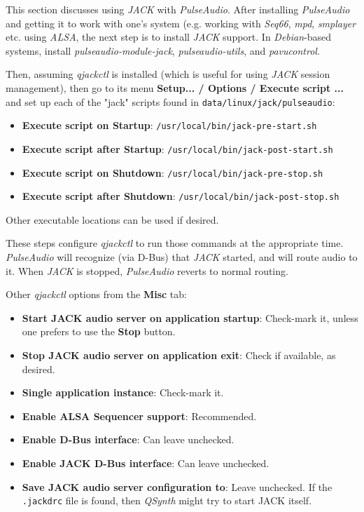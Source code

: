    This section discusses using \textsl{JACK} with \textsl{PulseAudio}.
   After installing \textsl{PulseAudio} and getting it to work with one's
   system (e.g. working with \textsl{Seq66}, \textsl{mpd},
   \textsl{smplayer} etc. using \textsl{ALSA},
   the next step is to install \textsl{JACK} support.
   In \textsl{Debian}-based systems, install \textsl{pulseaudio-module-jack},
   \textsl{pulseaudio-utils}, and \textsl{pavucontrol}.

   Then, assuming \textsl{qjackctl} is installed (which is useful for using
   \textsl{JACK} session management), then go to its menu
   \textbf{Setup... / Options / Execute script ...} and set up each of the
   "jack" scripts found in \texttt{data/linux/jack/pulseaudio}:

   \begin{itemize}
      \item \textbf{Execute script on Startup}:
         \texttt{/usr/local/bin/jack-pre-start.sh}
      \item \textbf{Execute script after Startup}:
         \texttt{/usr/local/bin/jack-post-start.sh}
      \item \textbf{Execute script on Shutdown}:
         \texttt{/usr/local/bin/jack-pre-stop.sh}
      \item \textbf{Execute script after Shutdown}:
         \texttt{/usr/local/bin/jack-post-stop.sh}
   \end{itemize}

   Other executable locations can be used if desired.

   These steps configure \textsl{qjackctl} to run those commands at
   the appropriate time.
   \textsl{PulseAudio} will recognize (via D-Bus) that \textsl{JACK} started,
   and will route audio to it. When \textsl{JACK} is stopped,
   \textsl{PulseAudio} reverts to normal routing.

   Other \textsl{qjackctl} options from the \textbf{Misc} tab:

   \begin{itemize}
      \item \textbf{Start JACK audio server on application startup}:
         Check-mark it, unless one prefers to use the \textbf{Stop} button.
      \item \textbf{Stop JACK audio server on application exit}:
         Check if available, as desired.
      \item \textbf{Single application instance}:
         Check-mark it.
      \item \textbf{Enable ALSA Sequencer support}:
         Recommended.
      \item \textbf{Enable D-Bus interface}:
         Can leave unchecked.
      \item \textbf{Enable JACK D-Bus interface}:
         Can leave unchecked.
      \item \textbf{Save JACK audio server configuration to}:
         Leave unchecked.  If the \texttt{.jackdrc} file is found, then
         \textsl{QSynth} might try to start JACK itself.
   \end{itemize}

